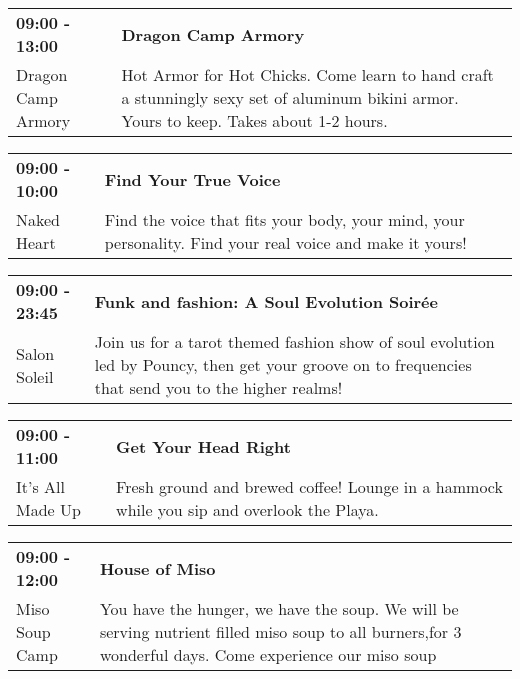 \begin{tabular}{ p{1in} p{2.2in} }
    \textbf{09:00 - 13:00} & \textbf{Dragon Camp Armory} \\
    Dragon Camp Armory \newline  & Hot Armor for Hot Chicks. Come learn to hand craft a stunningly sexy set of aluminum bikini armor. Yours to keep. Takes about 1-2 hours. \\
    \hline 
\end{tabular}
    
\begin{tabular}{ p{1in} p{2.2in} }
    \textbf{09:00 - 10:00} & \textbf{Find Your True Voice} \\
    Naked Heart \newline  & Find the voice that fits your body, your mind, your personality. Find your real voice and make it yours! \\
    \hline 
\end{tabular}
    
\begin{tabular}{ p{1in} p{2.2in} }
    \textbf{09:00 - 23:45} & \textbf{Funk and fashion: A Soul Evolution Soir\'ee } \\
    Salon Soleil \newline  & Join us for a tarot themed fashion show of soul evolution led by Pouncy, then get your groove on to frequencies that send you to the higher realms! \\
    \hline 
\end{tabular}
    
\begin{tabular}{ p{1in} p{2.2in} }
    \textbf{09:00 - 11:00} & \textbf{Get Your Head Right} \\
    It's All Made Up \newline  & Fresh ground and brewed coffee! Lounge in a hammock while you sip and overlook the Playa. \\
    \hline 
\end{tabular}
    
\begin{tabular}{ p{1in} p{2.2in} }
    \textbf{09:00 - 12:00} & \textbf{House of Miso } \\
    Miso Soup Camp \newline  & You have the hunger, we have the soup. We will be serving nutrient filled miso soup to all burners,for 3 wonderful days. Come experience our miso soup \\
    \hline 
\end{tabular}
    
